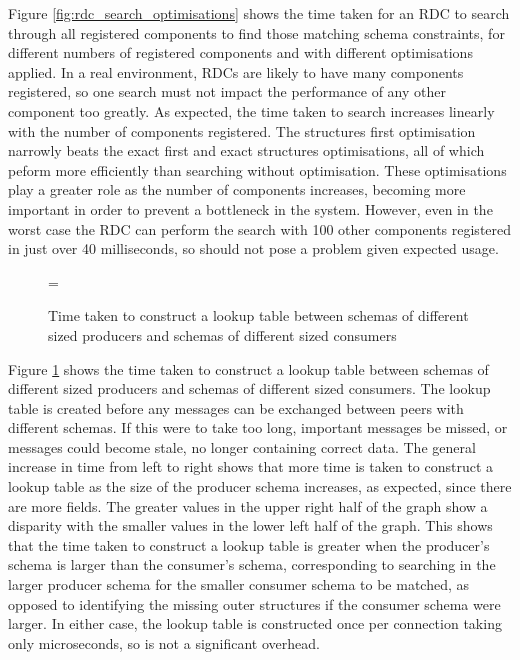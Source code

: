 \documentclass[12pt,twoside,notitlepage]{report}
\begin{document}
Figure \ref{fig:rdc_search_optimisations} shows the time taken for an RDC to search through all registered components to find those matching schema constraints, for different numbers of registered components and with different optimisations applied. 
In a real environment, RDCs are likely to have many components registered, so one search must not impact the performance of any other component too greatly.
As expected, the time taken to search increases linearly with the number of components registered. 
The structures first optimisation narrowly beats the exact first and exact structures optimisations, all of which peform more efficiently than searching without optimisation. 
These optimisations play a greater role as the number of components increases, becoming more important in order to prevent a bottleneck in the system. 
However, even in the worst case the RDC can perform the search with 100 other components registered in just over 40 milliseconds, so should not pose a problem given expected usage.

\begin{figure}[t]
\epsfxsize=\hsize
\centerline{}
\caption[Construct Lookup Times]{Time taken to construct a lookup table between schemas of different sized producers and schemas of different sized consumers}
\label{fig:construct_lookup}
\end{figure}

Figure \ref{fig:construct_lookup} shows the time taken to construct a lookup table between schemas of different sized producers and schemas of different sized consumers. 
The lookup table is created before any messages can be exchanged between peers with different schemas. 
If this were to take too long, important messages be missed, or messages could become stale, no longer containing correct data.
The general increase in time from left to right shows that more time is taken to construct a lookup table as the size of the producer schema increases, as expected, since there are more fields. 
The greater values in the upper right half of the graph show a disparity with the smaller values in the lower left half of the graph. 
This shows that the time taken to construct a lookup table is greater when the producer's schema is larger than the consumer's schema, corresponding to searching in the larger producer schema for the smaller consumer schema to be matched, as opposed to identifying the missing outer structures if the consumer schema were larger.
In either case, the lookup table is constructed once per connection taking only microseconds, so is not a significant overhead. 
\end{document}
